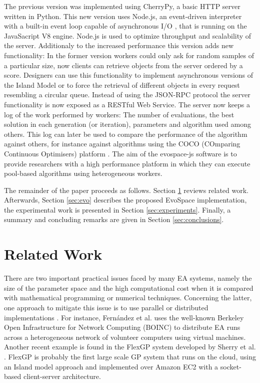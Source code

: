The previous version %
was implemented using CherryPy, a basic HTTP 
server written in Python. This new version uses Node.js, an 
event-driven interpreter with a built-in event loop capable of
asynchronous I/O \cite{tilkov2010node}, that is 
running on the JavaSacript V8 engine. Node.js is used 
to optimize throughput and scalability of the server. %
Additionaly to the  increased performance this version 
adds new functionality: In the former version workers could only
ask for random samples of a particular size, now clients 
can retrieve objects from the server ordered by a score. 
Designers can use this functionality to implement 
asynchronous versions of the Island Model or to force 
the retrieval of different objects in every request 
resembling a circular queue. Instead of using the JSON-RPC 
protocol the server functionality is now exposed as a RESTful 
Web Service. The server now keeps a log of the work performed 
by workers: The number of evaluations, the best solution in each 
generation (or iteration), parameters and algorithm used among others.
This log can later be used to compare the performance of 
the algorithm against others, for instance against 
algorithms using the COCO (COmparing Continuous Optimisers)
platform \cite{hansen2016coco}.
The aim of the evospace-js software is to provide 
researchers with a high performance platform in which 
they can execute pool-based algorithms using heterogeneous workers. 

The remainder of the paper proceeds as follows. Section \ref{sec:work} 
reviews related work. Afterwards, Section \ref{sec:evo} describes the
proposed EvoSpace implementation, the experimental work is presented in 
Section \ref{sec:experiments}. Finally, a summary and 
concluding remarks are given in Section \ref{sec:conclusions}.


\section{Related Work}
\label{sec:work}
There are two important practical issues faced by many EA systems, namely the size of the parameter 
space and the high computational cost when it is compared with mathematical programming or numerical techniques.
Concerning the latter, one approach to mitigate this issue is to use parallel or 
distributed implementations \cite{cantu-paz:migration-policies,duda2013gpu}.
For instance, Fern\'andez et al. \cite{nc} %
uses the well-known Berkeley Open Infrastructure for Network Computing (BOINC) to distribute EA runs across a
heterogeneous network of volunteer computers using virtual machines. Another recent example is 
found in the FlexGP system developed by Sherry et al. \cite{sherry2012flex}. FlexGP is probably the first large scale GP system 
that runs on the cloud, using an Island model approach and implemented over Amazon EC2 with a 
socket-based client-server architecture.

